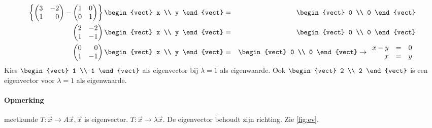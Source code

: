 \begin{eqnarray*}
	\left\{ \begin{pmatrix*}[r] 3 & -2 \\ 1 & 0 \end{pmatrix*} - \begin{pmatrix} 1 & 0 \\ 0 & 1 \end{pmatrix} \right\} \begin{vect} x \\ y \end{vect} &=& \begin{vect}  0 \\ 0 \end{vect} \\
	\begin{pmatrix*}[r] 2 & -2 \\ 1 & -1 \end{pmatrix*} \begin{vect} x \\ y \end{vect} &=& \begin{vect} 0 \\ 0 \end{vect} \\
	\begin{pmatrix*}[r] 0 & 0 \\ 1 & -1 \end{pmatrix*} \begin{vect} x \\ y \end{vect} &=& \begin{vect} 0 \\ 0 \end{vect} \to \begin{array}{rcl} x - y & = & 0 \\ x & = & y \end{array}
\end{eqnarray*}
Kies $\begin{vect} 1 \\ 1 \end{vect}$ als eigenvector bij $\lambda = 1$ als eigenwaarde. Ook $\begin{vect} 2 \\ 2 \end{vect}$ is een eigenvector voor $\lambda = 1$ als eigenwaarde.

\paragraph{Opmerking} meetkunde
$T: \vec{x} \to  A \vec{x}, \vec{x}$ is eigenvector. $T: \vec{x} \to \lambda \vec{x}$. De eigenvector behoudt zijn richting. Zie \autoref{fig:ev}.


